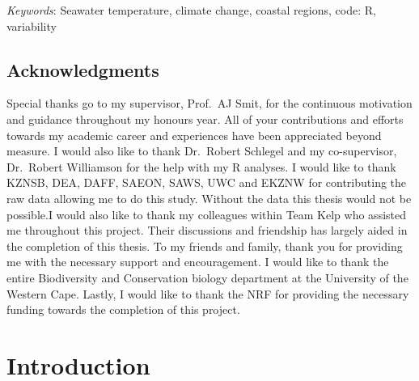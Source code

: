 \documentclass[12pt,A4paper,]{article}
\begin{document}
\emph{Keywords}: Seawater temperature, climate change, coastal regions,
code: R, variability

\newpage

\subsection{Acknowledgments}\label{acknowledgments}

Special thanks go to my supervisor, Prof.~AJ Smit, for the continuous
motivation and guidance throughout my honours year. All of your
contributions and efforts towards my academic career and experiences
have been appreciated beyond measure. I would also like to thank
Dr.~Robert Schlegel and my co-supervisor, Dr.~Robert Williamson for the
help with my R analyses. I would like to thank KZNSB, DEA, DAFF, SAEON,
SAWS, UWC and EKZNW for contributing the raw data allowing me to do this
study. Without the data this thesis would not be possible.I would also
like to thank my colleagues within Team Kelp who assisted me throughout
this project. Their discussions and friendship has largely aided in the
completion of this thesis. To my friends and family, thank you for
providing me with the necessary support and encouragement. I would like
to thank the entire Biodiversity and Conservation biology department at
the University of the Western Cape. Lastly, I would like to thank the
NRF for providing the necessary funding towards the completion of this
project.

\newpage

\section{Introduction}\label{introduction}
\end{document}
